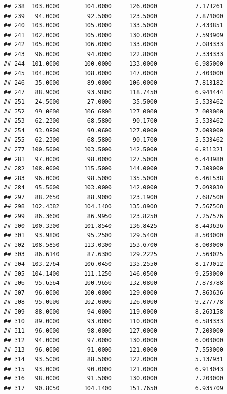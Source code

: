 \documentclass[]{article}
\begin{document}
\begin{verbatim}
## 238  103.0000       104.0000     126.0000           7.178261
## 239   94.0000        92.5000     123.5000           7.874000
## 240  103.0000       105.0000     133.5000           7.430851
## 241  102.0000       105.0000     130.0000           7.590909
## 242  105.0000       106.0000     133.0000           7.083333
## 243   96.0000        94.0000     122.8000           7.333333
## 244  101.0000       100.0000     133.0000           6.985000
## 245  104.0000       108.0000     147.0000           7.400000
## 246   35.0000        89.0000     106.0000           7.818182
## 247   88.9000        93.9800     118.7450           6.944444
## 251   24.5000        27.0000      35.5000           5.538462
## 252   99.0600       106.6800     127.0000           7.000000
## 253   62.2300        68.5800      90.1700           5.538462
## 254   93.9800        99.0600     127.0000           7.000000
## 255   62.2300        68.5800      90.1700           5.538462
## 277  100.5000       103.5000     142.5000           6.811321
## 281   97.0000        98.0000     127.5000           6.448980
## 282  108.0000       115.5000     144.0000           7.300000
## 283   96.0000        98.5000     135.5000           6.461538
## 284   95.5000       103.0000     142.0000           7.098039
## 297   88.2650        88.9000     123.1900           7.687500
## 298  102.4382       104.1400     135.8900           7.567568
## 299   86.3600        86.9950     123.8250           7.257576
## 300  100.3300       101.8540     136.8425           8.443636
## 301   93.9800        95.2500     129.5400           8.500000
## 302  108.5850       113.0300     153.6700           8.000000
## 303   86.6140        87.6300     129.2225           7.563025
## 304  103.2764       106.0450     135.2550           8.179012
## 305  104.1400       111.1250     146.0500           9.250000
## 306   95.6564       100.9650     132.0800           7.878788
## 307   96.0000       100.0000     129.0000           7.863636
## 308   95.0000       102.0000     126.0000           9.277778
## 309   88.0000        94.0000     119.0000           8.263158
## 310   89.0000        93.0000     110.0000           6.583333
## 311   96.0000        98.0000     127.0000           7.200000
## 312   94.0000        97.0000     130.0000           6.000000
## 313   96.0000        91.0000     121.0000           7.550000
## 314   93.5000        88.5000     122.0000           5.137931
## 315   93.0000        90.0000     121.0000           6.913043
## 316   98.0000        91.5000     130.0000           7.200000
## 317   90.8050       104.1400     151.7650           6.936709

\end{verbatim}
\end{document}
